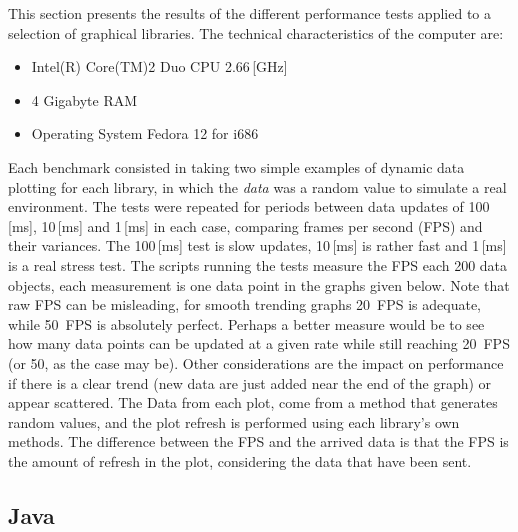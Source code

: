 This section presents the results of the different performance tests applied to
a selection of graphical libraries.
The technical characteristics of the computer are:
\begin{itemize}
\item Intel(R) Core(TM)2 Duo CPU 2.66\,[GHz]
\item 4 Gigabyte RAM
\item Operating System Fedora 12 for i686
\end{itemize}

Each benchmark consisted in taking two simple examples
of dynamic data plotting for each library,
in which the \emph{data} was a random value to simulate a real environment.
The tests were repeated
for periods between data updates of 100\,[ms], 10\,[ms] and 1\,[ms]
in each case,
comparing frames per second (FPS) and their variances.
The 100\,[ms] test is slow updates,
10\,[ms] is rather fast and 1\,[ms] is a real stress test.
The scripts running the tests measure the FPS each 200 data objects,
each measurement is one data point in the graphs given below.
Note that raw FPS can be misleading,
for smooth trending graphs 20~FPS is adequate,
while 50~FPS is absolutely perfect.
Perhaps a better measure would be to see how many data points can be updated
at a given rate while still reaching 20~FPS (or 50, as the case may be).
Other considerations are the impact on performance
if there is a clear trend
(new data are just added near the end of the graph)
or appear scattered.
The Data from each plot, come from a method that generates random values,
and the plot refresh is performed using each library's own methods.
The difference between the FPS and the arrived data is that the FPS is
the amount of refresh in the plot, considering the data that have been sent.

\subsection{Java}

